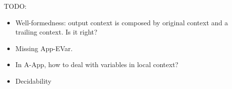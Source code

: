 TODO:
\begin{itemize}
  \item Well-formedness: output context is composed by original context and a
    trailing context. Is it right?
  \item Missing App-EVar.
  \item In A-App, how to deal with variables in local context?
  \item Decidability
\end{itemize}


